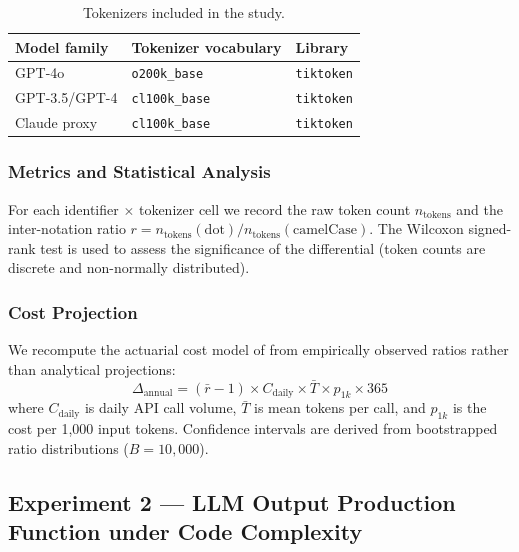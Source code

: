 \documentclass[11pt,a4paper]{article}
\begin{document}
\begin{table}[h]
\centering
\caption{Tokenizers included in the study.}
\label{tab:tokenizers}
\begin{tabular}{lll}
\toprule
Model family & Tokenizer vocabulary & Library \\
\midrule
GPT-4o              & \texttt{o200k\_base}  & \texttt{tiktoken} \\
GPT-3.5/GPT-4       & \texttt{cl100k\_base} & \texttt{tiktoken} \\
Claude proxy        & \texttt{cl100k\_base} & \texttt{tiktoken} \\
\bottomrule
\end{tabular}
\end{table}

\subsubsection{Metrics and Statistical Analysis}

For each identifier $\times$ tokenizer cell we record the raw token count
$n_{\mathrm{tokens}}$ and the inter-notation ratio
$r = n_{\mathrm{tokens}}(\mathrm{dot}) / n_{\mathrm{tokens}}(\mathrm{camelCase})$.
The Wilcoxon signed-rank test is used to assess the significance of the
differential (token counts are discrete and non-normally distributed).

\subsubsection{Cost Projection}

We recompute the actuarial cost model of \citet{pereira2026a} from empirically
observed ratios rather than analytical projections:
\begin{equation}
  \Delta_{\mathrm{annual}} =
    (\bar{r} - 1)\times C_{\mathrm{daily}} \times \bar{T} \times p_{1k} \times 365
  \label{eq:cost}
\end{equation}
where $C_{\mathrm{daily}}$ is daily API call volume, $\bar{T}$ is mean tokens
per call, and $p_{1k}$ is the cost per 1,000 input tokens. Confidence
intervals are derived from bootstrapped ratio distributions ($B = 10{,}000$).

\subsection{Experiment 2 --- LLM Output Production Function under Code Complexity}
\label{sec:exp2}
\end{document}
